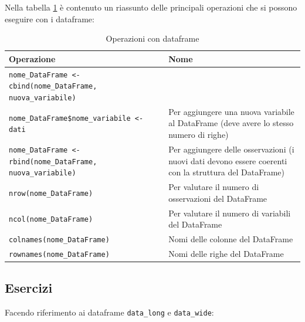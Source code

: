 \documentclass[
]{book}
\begin{document}
Nella tabella \ref{tab:frame-tab} è contenuto un riassunto delle principali operazioni che si possono eseguire con i dataframe:

\begin{table}[!h]

\caption{\label{tab:frame-tab}Operazioni con dataframe}
\centering
\begin{tabular}[t]{l|l}
\hline
Operazione & Nome\\
\hline
\texttt{nome\_DataFrame <- cbind(nome\_DataFrame, nuova\_variabile)} \\ \texttt{nome\_DataFrame\$nome\_variabile <- dati} & Per aggiungere una nuova variabile al DataFrame (deve avere lo stesso numero di righe)\\
\hline
\texttt{nome\_DataFrame <- rbind(nome\_DataFrame, nuova\_variabile)} & Per aggiungere delle osservazioni (i nuovi dati devono essere coerenti con la struttura del DataFrame)\\
\hline
\texttt{nrow(nome\_DataFrame)} & Per valutare il numero di osservazioni del DataFrame\\
\hline
\texttt{ncol(nome\_DataFrame)} & Per valutare il numero di variabili del DataFrame\\
\hline
\texttt{colnames(nome\_DataFrame)} & Nomi delle colonne del DataFrame\\
\hline
\texttt{rownames(nome\_DataFrame)} & Nomi delle righe del DataFrame\\
\hline
\end{tabular}
\end{table}

\hypertarget{esercizi-9}{%
\subsection*{Esercizi}\label{esercizi-9}}

Facendo riferimento ai dataframe \texttt{data\_long} e \texttt{data\_wide}:
\end{document}
